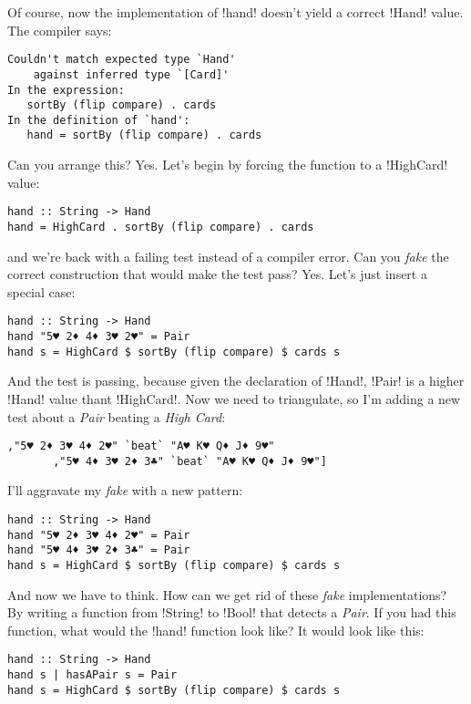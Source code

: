 \error Of course, now the implementation of \il!hand! doesn't yield a correct \il!Hand! value.
\lhN The compiler says:
\begin{small}
\begin{verbatim}
Couldn't match expected type `Hand' 
    against inferred type `[Card]'
In the expression: 
   sortBy (flip compare) . cards
In the definition of `hand': 
   hand = sortBy (flip compare) . cards
\end{verbatim}
\end{small}
Can you arrange this?
\lhA Yes. Let's begin by forcing the function to a \il!HighCard! value:
\begin{lstlisting}[frame=single]
hand :: String -> Hand
hand = HighCard . sortBy (flip compare) . cards
\end{lstlisting}
\failure and we're back with a failing test instead of a compiler error.
\lhN Can you \emph{fake} the correct construction that would make the test pass?
\lhA Yes. Let's just insert a special case:
\begin{lstlisting}[frame=single]
hand :: String -> Hand
hand "5♥ 2♦ 4♦ 3♥ 2♥" = Pair 
hand s = HighCard $ sortBy (flip compare) $ cards s
\end{lstlisting}
\success And the test is passing, because given the declaration of \il!Hand!, \il!Pair! is a higher \il!Hand! value thant \il!HighCard!.
\lhN Now we need to triangulate, so I'm adding a new test about a \emph{Pair} beating a \emph{High Card}:
\begin{lstlisting}[frame=single]
       ,"5♥ 2♦ 3♥ 4♦ 2♥" `beat` "A♥ K♥ Q♦ J♦ 9♥"
       ,"5♥ 4♦ 3♥ 2♦ 3♣" `beat` "A♥ K♥ Q♦ J♦ 9♥"]
\end{lstlisting}
\hspace*{\fill}
\lhA \failure I'll aggravate my \emph{fake} with a new pattern:
\begin{lstlisting}[frame=single]
hand :: String -> Hand
hand "5♥ 2♦ 3♥ 4♦ 2♥" = Pair 
hand "5♥ 4♦ 3♥ 2♦ 3♣" = Pair
hand s = HighCard $ sortBy (flip compare) $ cards s
\end{lstlisting}
\success And now we have to think.
\lhN How can we get rid of these \emph{fake} implementations?
\lhA By writing a function from \il!String! to \il!Bool! that detects a \emph{Pair}.
\lhN If you had this function, what would the \il!hand! function look like?
\lhA It would look like this:
\begin{lstlisting}[frame=single]
hand :: String -> Hand
hand s | hasAPair s = Pair
hand s = HighCard $ sortBy (flip compare) $ cards s
\end{lstlisting}
